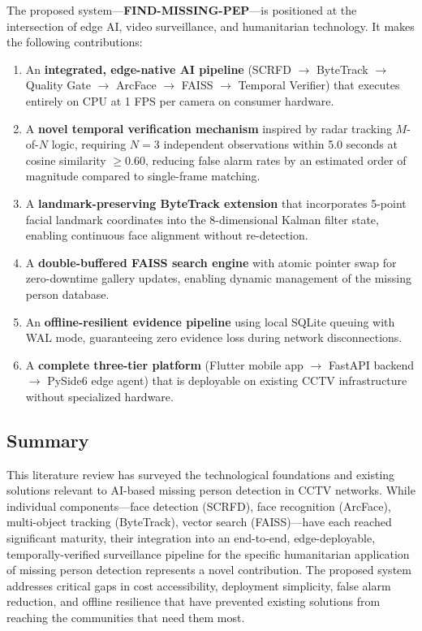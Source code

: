 \documentclass[12pt, a4paper]{article}
\begin{document}
The proposed system---\textbf{FIND-MISSING-PEP}---is positioned at the intersection of edge AI, video surveillance, and humanitarian technology. It makes the following contributions:

\begin{enumerate}[label=(\arabic*)]
    \item An \textbf{integrated, edge-native AI pipeline} (SCRFD $\rightarrow$ ByteTrack $\rightarrow$ Quality Gate $\rightarrow$ ArcFace $\rightarrow$ FAISS $\rightarrow$ Temporal Verifier) that executes entirely on CPU at 1 FPS per camera on consumer hardware.
    
    \item A \textbf{novel temporal verification mechanism} inspired by radar tracking $M$-of-$N$ logic, requiring $N=3$ independent observations within 5.0 seconds at cosine similarity $\geq 0.60$, reducing false alarm rates by an estimated order of magnitude compared to single-frame matching.
    
    \item A \textbf{landmark-preserving ByteTrack extension} that incorporates 5-point facial landmark coordinates into the 8-dimensional Kalman filter state, enabling continuous face alignment without re-detection.
    
    \item A \textbf{double-buffered FAISS search engine} with atomic pointer swap for zero-downtime gallery updates, enabling dynamic management of the missing person database.
    
    \item An \textbf{offline-resilient evidence pipeline} using local SQLite queuing with WAL mode, guaranteeing zero evidence loss during network disconnections.
    
    \item A \textbf{complete three-tier platform} (Flutter mobile app $\rightarrow$ FastAPI backend $\rightarrow$ PySide6 edge agent) that is deployable on existing CCTV infrastructure without specialized hardware.
\end{enumerate}

\subsection{Summary}

This literature review has surveyed the technological foundations and existing solutions relevant to AI-based missing person detection in CCTV networks. While individual components---face detection (SCRFD), face recognition (ArcFace), multi-object tracking (ByteTrack), vector search (FAISS)---have each reached significant maturity, their integration into an end-to-end, edge-deployable, temporally-verified surveillance pipeline for the specific humanitarian application of missing person detection represents a novel contribution. The proposed system addresses critical gaps in cost accessibility, deployment simplicity, false alarm reduction, and offline resilience that have prevented existing solutions from reaching the communities that need them most.
\end{document}
